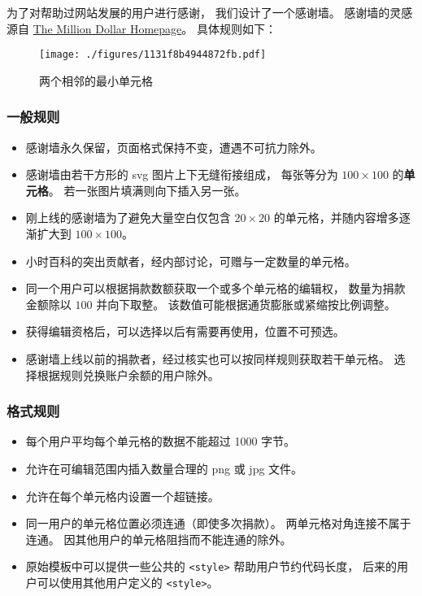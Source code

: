 
\begin{issues}
\issueDraft
{}
\end{issues}

为了对帮助过网站发展的用户进行感谢， 我们设计了一个感谢墙。 感谢墙的灵感源自 \href{https://en.wikipedia.org/wiki/The_Million_Dollar_Homepage}{The Million Dollar Homepage}。 具体规则如下：

\begin{figure}[ht]
\centering
\texttt{[image: ./figures/1131f8b4944872fb.pdf]}
\caption{两个相邻的最小单元格} \label{fig_thanks_1}
\end{figure}

\subsubsection{一般规则}
\begin{itemize}
\item 感谢墙永久保留，页面格式保持不变，遭遇不可抗力除外。
\item 感谢墙由若干方形的 svg 图片上下无缝衔接组成， 每张等分为 $100\times 100$ 的\textbf{单元格}。 若一张图片填满则向下插入另一张。
\item 刚上线的感谢墙为了避免大量空白仅包含 $20\times 20$ 的单元格，并随内容增多逐渐扩大到 $100\times 100$。
\item 小时百科的突出贡献者，经内部讨论，可赠与一定数量的单元格。
\item 同一个用户可以根据捐款数额获取一个或多个单元格的编辑权， 数量为捐款金额除以 $100$ 并向下取整。 该数值可能根据通货膨胀或紧缩按比例调整。
\item 获得编辑资格后，可以选择以后有需要再使用，位置不可预选。
\item 感谢墙上线以前的捐款者，经过核实也可以按同样规则获取若干单元格。 选择根据规则兑换账户余额的用户除外。
\end{itemize}

\subsubsection{格式规则}
\begin{itemize}
\item 每个用户平均每个单元格的数据不能超过 1000 字节。
\item 允许在可编辑范围内插入数量合理的 png 或 jpg 文件。
\item 允许在每个单元格内设置一个超链接。
\item 同一用户的单元格位置必须连通（即使多次捐款）。 两单元格对角连接不属于连通。 因其他用户的单元格阻挡而不能连通的除外。
\item 原始模板中可以提供一些公共的 \verb`<style>` 帮助用户节约代码长度， 后来的用户可以使用其他用户定义的 \verb`<style>`。
\end{itemize}

